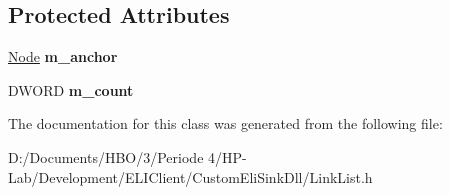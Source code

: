 \subsection*{Protected Attributes}
\begin{DoxyCompactItemize}
\item 
\mbox{\label{class_list_af4b907a3859420bcaf621d22f4e7a199}} 
\hyperlink{struct_list_1_1_node}{Node} {\bfseries m\+\_\+anchor}
\item 
\mbox{\label{class_list_a7207546724e193e84ac1a2ef929e0e24}} 
D\+W\+O\+RD {\bfseries m\+\_\+count}
\end{DoxyCompactItemize}


The documentation for this class was generated from the following file\+:\begin{DoxyCompactItemize}
\item 
D\+:/\+Documents/\+H\+B\+O/3/\+Periode 4/\+H\+P-\/\+Lab/\+Development/\+E\+L\+I\+Client/\+Custom\+Eli\+Sink\+Dll/Link\+List.\+h\end{DoxyCompactItemize}

